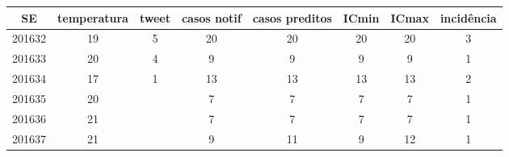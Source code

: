 \begin{tabular}{c|ccccccc}
  \hline
SE & temperatura & tweet & casos notif & casos preditos & ICmin & ICmax & incidência \\ 
  \hline
201632 & 19 & 5 & 20 & 20 & 20 & 20 & 3 \\ 
  201633 & 20 & 4 & 9 & 9 & 9 & 9 & 1 \\ 
  201634 & 17 & 1 & 13 & 13 & 13 & 13 & 2 \\ 
  201635 & 20 &  & 7 & 7 & 7 & 7 & 1 \\ 
  201636 & 21 &  & 7 & 7 & 7 & 7 & 1 \\ 
  201637 & 21 &  & 9 & 11 & 9 & 12 & 1 \\ 
   \hline
\end{tabular}
